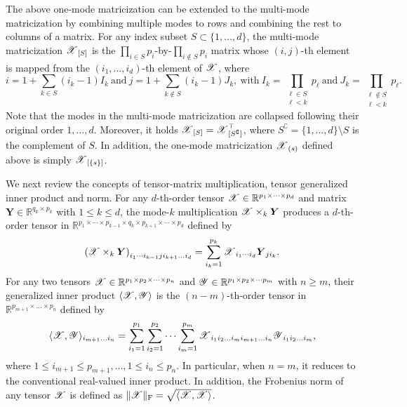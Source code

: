 \documentclass[12pt]{article}
\newcommand{\bm}{\boldsymbol}
\newcommand{\cm}[1]{\mbox{\boldmath$\mathscr{#1}$}}
\begin{document}
The above one-mode matricization can be extended to the multi-mode matricization by combining multiple modes to rows and combining the rest to columns of a matrix. For any index subset $S\subset\{1,\dots,d\}$, the multi-mode matricization $\cm{X}_{[S]}$ is the $\prod_{i\in S}p_i$-by-$\prod_{i\notin S}p_i$ matrix whose $(i,j)$-th element is mapped from the $(i_1,\dots,i_d)$-th element of $\cm{X}$, where
\begin{equation}
i=1+\sum_{k\in S}(i_k-1)I_k ~\text{and}~ j=1+\sum_{k\notin S}(i_k-1)J_k,~\text{with}~I_k=\prod_{\substack{\ell\in S\\\ell<k}}p_\ell~\text{and}~J_k=\prod_{\substack{\ell\notin S\\\ell<k}}p_\ell.
\end{equation}
Note that the modes in the multi-mode matricization are collapsed following their original order $1, \dots, d$. 
Moreover, it holds $\cm{X}_{[S]}=\cm{X}_{[S^\complement]}^\top$, where $S^\complement=\{1,\dots, d\}\setminus S$ is the complement of $S$.
In addition, the one-mode matricization $\cm{X}_{(s)}$ defined above is simply $\cm{X}_{[\{s\}]}$. 

We next review the concepts of tensor-matrix multiplication, tensor generalized inner product and norm. For any $d$-th-order tensor $\cm{X}\in\mathbb{R}^{p_1\times\cdots\times p_d}$ and matrix $\bm{Y}\in\mathbb{R}^{q_k\times p_k}$ with $1\leq k\leq d$,
the mode-$k$ multiplication $\cm{X}\times_k\bm{Y}$ produces a $d$-th-order tensor in $\mathbb{R}^{p_1\times\cdots\times p_{k-1}\times q_k\times p_{k+1}\times\cdots\times p_d}$  defined by
\begin{equation}
\left(\cm{X}\times_k\bm{Y}\right)_{i_1\cdots i_{k-1}ji_{k+1}\dots i_d}=\sum_{i_k=1}^{p_k}\cm{X}_{i_1\cdots i_d}\bm{Y}_{ji_k}.
\end{equation}
For any two tensors $\cm{X}\in\mathbb{R}^{p_1\times p_2\times\cdots\times p_n}$ and $\cm{Y}\in\mathbb{R}^{p_1\times p_2\times\cdots p_m}$ with $n\geq m$, their generalized inner product $\langle\cm{X},\cm{Y}\rangle$ is the $(n-m)$-th-order tensor  in $\mathbb{R}^{p_{m+1}\times\dots\times p_n}$ defined by
\begin{equation}\label{eq:tensorinner}
\langle\cm{X},\cm{Y}\rangle_{i_{m+1}\dots i_{n}}=\sum_{i_1=1}^{p_1}\sum_{i_2=1}^{p_2}\dots\sum_{i_m=1}^{p_m}\cm{X}_{i_1i_2\dots i_mi_{m+1}\dots i_n}\cm{Y}_{i_1i_2\dots i_m},
\end{equation}
where  $1\leq i_{m+1}\leq p_{m+1},\dots,1\leq i_n\leq p_n$. In particular, when $n=m$, it reduces to the conventional real-valued inner product.  In addition,  the Frobenius norm of any tensor $\cm{X}$ is defined as $\|\cm{X}\|_{\text{F}}=\sqrt{\langle\cm{X},\cm{X}\rangle}$. 
\end{document}
